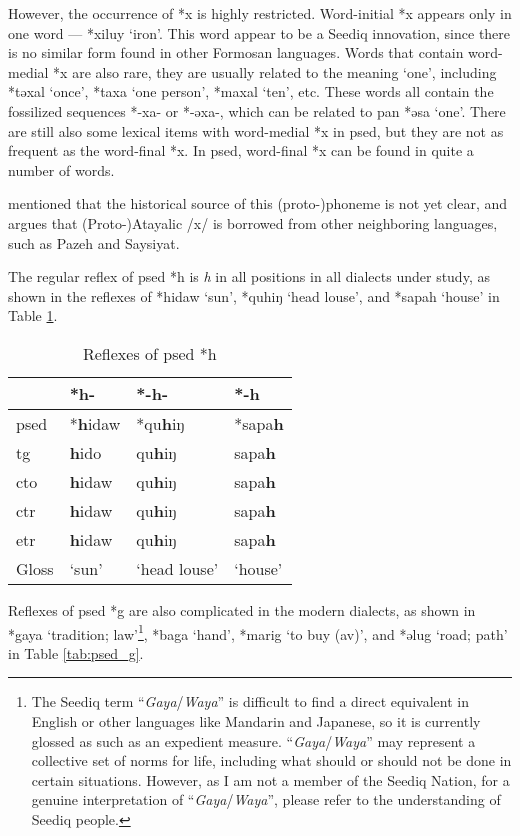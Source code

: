 However, the occurrence of *x is highly restricted. Word-initial *x appears only in one word --- *xiluy `iron'. This word appear to be a Seediq innovation, since there is no similar form found in other Formosan languages. Words that contain word-medial *x are also rare, they are usually related to the meaning `one', including *təxal `once', *taxa `one person', *maxal `ten', etc. These words all contain the fossilized sequences *-xa- or *-əxa-, which can be related to \acs{pan} *əsa `one'. There are still also some lexical items with word-medial *x in \acl{psed}, but they are not as frequent as the word-final *x. In \acl{psed}, word-final *x can be found in quite a number of words. 

\textcite{li1981paic} mentioned that the historical source of this (proto-)phoneme is not yet clear, and \textcite{song2024Aicx} argues that (Proto-)Atayalic /x/ is borrowed from other neighboring languages, such as Pazeh and Saysiyat. 

The regular reflex of \acl{psed} *h is \textit{h} in all positions in all dialects under study, as shown in the reflexes of *hidaw `sun', *quhiŋ `head louse', and *sapah `house' in Table \ref{tab:psed_h}.

\begin{table}[!htbp]
\centering
\caption{Reflexes of \acl{psed} *h}
\label{tab:psed_h}
\begin{tabular}{llll}
\hline
           & *h-    & *-h-         & *-h     \\ \hline
\acs{psed} & *\textbf{h}idaw & *qu\textbf{h}iŋ       & *sapa\textbf{h}  \\ \hdashline
\acs{tg}   & \textbf{h}ido   & qu\textbf{h}iŋ        & sapa\textbf{h}   \\
\acs{cto}  & \textbf{h}idaw  & qu\textbf{h}iŋ        & sapa\textbf{h}   \\
\acs{ctr}  & \textbf{h}idaw  & qu\textbf{h}iŋ        & sapa\textbf{h}   \\
\acs{etr}  & \textbf{h}idaw  & qu\textbf{h}iŋ        & sapa\textbf{h}   \\ \hline
Gloss      & `sun'  & `head louse' & `house' \\ \hline
\end{tabular}
\end{table}

Reflexes of \acl{psed} *g are also complicated in the modern dialects, as shown in *gaya `tradition; law'\footnote{The Seediq term ``\textit{Gaya}/\textit{Waya}'' is difficult to find a direct equivalent in English or other languages like Mandarin and Japanese, so it is currently glossed as such as an expedient measure. ``\textit{Gaya}/\textit{Waya}'' may represent a collective set of norms for life, including what should or should not be done in certain situations. However, as I am not a member of the Seediq Nation, for a genuine interpretation of ``\textit{Gaya}/\textit{Waya}'', please refer to the understanding of Seediq people.}, *baga `hand', *marig `to buy (\acs{av})', and *əlug `road; path' in Table \ref{tab:psed_g}.  

